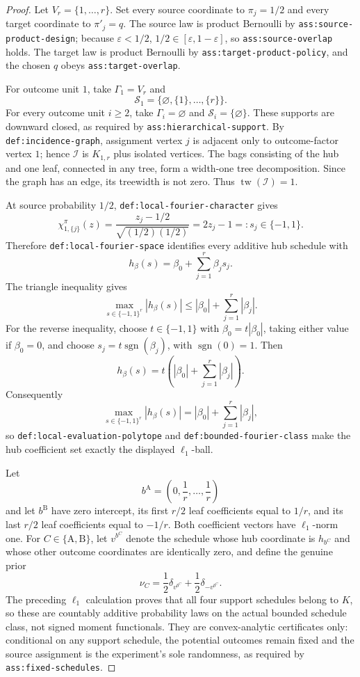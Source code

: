 \documentclass{article}
\begin{document}
\begin{proof}
Let \(V_r=\{1,\ldots,r\}\).  Set every source coordinate to \(\pi_j=1/2\) and every target coordinate to \(\pi'_j=q\).  The source law is product Bernoulli by \texttt{ass:source-product-design}; because \(\varepsilon<1/2\), \(1/2\in[\varepsilon,1-\varepsilon]\), so \texttt{ass:source-overlap} holds.  The target law is product Bernoulli by \texttt{ass:target-product-policy}, and the chosen \(q\) obeys \texttt{ass:target-overlap}.

For outcome unit \(1\), take \(\Gamma_1=V_r\) and
\[
 \mathcal S_1=\{\varnothing,\{1\},\ldots,\{r\}\}.
\]
For every outcome unit \(i\ge2\), take \(\Gamma_i=\varnothing\) and \(\mathcal S_i=\{\varnothing\}\).  These supports are downward closed, as required by \texttt{ass:hierarchical-support}.  By \texttt{def:incidence-graph}, assignment vertex \(j\) is adjacent only to outcome-factor vertex \(1\); hence \(\mathcal I\) is \(K_{1,r}\) plus isolated vertices.  The bags consisting of the hub and one leaf, connected in any tree, form a width-one tree decomposition.  Since the graph has an edge, its treewidth is not zero.  Thus \(\operatorname{tw}(\mathcal I)=1\).

At source probability \(1/2\), \texttt{def:local-fourier-character} gives
\[
 \chi_{1,\{j\}}^\pi(z)=\frac{z_j-1/2}{\sqrt{(1/2)(1/2)}}=2z_j-1=:s_j\in\{-1,1\}.
\]
Therefore \texttt{def:local-fourier-space} identifies every additive hub schedule with
\[
 h_\beta(s)=\beta_0+\sum_{j=1}^r\beta_js_j.
\]
The triangle inequality gives
\[
 \max_{s\in\{-1,1\}^r}|h_\beta(s)|
 \le |\beta_0|+\sum_{j=1}^r|\beta_j|.
\]
For the reverse inequality, choose \(t\in\{-1,1\}\) with \(\beta_0=t|\beta_0|\), taking either value if \(\beta_0=0\), and choose \(s_j=t\operatorname{sgn}(\beta_j)\), with \(\operatorname{sgn}(0)=1\).  Then
\[
 h_\beta(s)=t\left(|\beta_0|+\sum_{j=1}^r|\beta_j|\right).
\]
Consequently
\[
 \max_{s\in\{-1,1\}^r}|h_\beta(s)|
 =|\beta_0|+\sum_{j=1}^r|\beta_j|,
\]
so \texttt{def:local-evaluation-polytope} and \texttt{def:bounded-fourier-class} make the hub coefficient set exactly the displayed \(\ell_1\)-ball.

Let
\[
 b^{\mathrm A}=\left(0,\frac1r,\ldots,\frac1r\right)
\]
and let \(b^{\mathrm B}\) have zero intercept, its first \(r/2\) leaf coefficients equal to \(1/r\), and its last \(r/2\) leaf coefficients equal to \(-1/r\).  Both coefficient vectors have \(\ell_1\)-norm one.  For \(C\in\{\mathrm A,\mathrm B\}\), let \(v^{b^C}\) denote the schedule whose hub coordinate is \(h_{b^C}\) and whose other outcome coordinates are identically zero, and define the genuine prior
\[
 \nu_C=\frac12\delta_{v^{b^C}}+\frac12\delta_{-v^{b^C}}.
\]
The preceding \(\ell_1\) calculation proves that all four support schedules belong to \(K\), so these are countably additive probability laws on the actual bounded schedule class, not signed moment functionals.  They are convex-analytic certificates only: conditional on any support schedule, the potential outcomes remain fixed and the source assignment is the experiment's sole randomness, as required by \texttt{ass:fixed-schedules}.


\end{proof}
\end{document}
